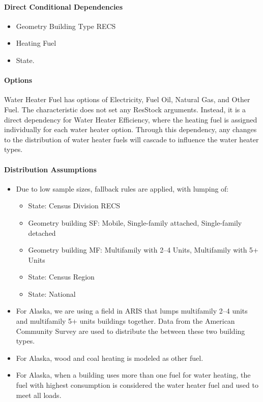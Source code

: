 \paragraph{Direct Conditional Dependencies}
\begin{itemize}
    \item Geometry Building Type RECS
    \item Heating Fuel
    \item State.
\end{itemize}

\paragraph{Options}
Water Heater Fuel has options of Electricity, Fuel Oil, Natural Gas, and Other Fuel. The characteristic does not set any ResStock arguments. Instead, it is a direct dependency for Water Heater Efficiency, where the heating fuel is assigned individually for each water heater option. Through this dependency, any changes to the distribution of water heater fuels will cascade to influence the water heater types.

\paragraph{Distribution Assumptions}
\begin{itemize}
\item
  Due to low sample sizes, fallback rules are applied, with lumping of:
  
  \begin{itemize}
  \item
    State: Census Division RECS
  \item
    Geometry building SF: Mobile, Single-family attached, Single-family detached
  \item
    Geometry building MF: Multifamily with 2--4 Units,
    Multifamily with 5+ Units
  \item
    State: Census Region
\item 
State: National
  \end{itemize}
\item
  For Alaska, we are using a field in ARIS that lumps multifamily 2--4
  units and multifamily 5+ units buildings together. Data from the
  American Community Survey are used to distribute the between these two
  building types.
\item
  For Alaska, wood and coal heating is modeled as other fuel.
\item
  For Alaska, when a building uses more than one fuel for water heating,
  the fuel with highest consumption is considered the water heater fuel and used to meet all loads.
\end{itemize}

